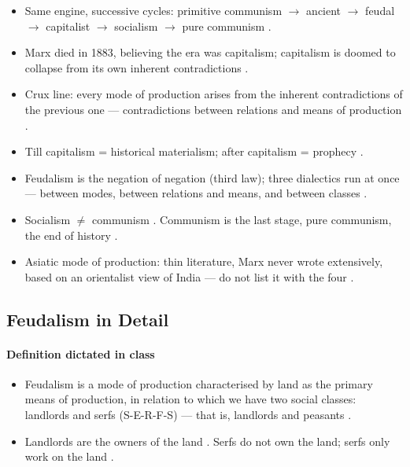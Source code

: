 \begin{QuickRevision}
\begin{itemize}
    \item Same engine, successive cycles: primitive communism $\rightarrow$ ancient $\rightarrow$ feudal $\rightarrow$ capitalist $\rightarrow$ socialism $\rightarrow$ pure communism .
    \item Marx died in 1883, believing the era was capitalism; capitalism is doomed to collapse from its own inherent contradictions .
    \item Crux line: every mode of production arises from the inherent contradictions of the previous one --- contradictions between relations and means of production .
    \item Till capitalism = historical materialism; after capitalism = prophecy .
    \item Feudalism is the negation of negation (third law); three dialectics run at once --- between modes, between relations and means, and between classes .
    \item Socialism $\neq$ communism . Communism is the last stage, pure communism, the end of history .
    \item Asiatic mode of production: thin literature, Marx never wrote extensively, based on an orientalist view of India --- do not list it with the four .
\end{itemize}
\end{QuickRevision}

\subsection{Feudalism in Detail}

\paragraph{Definition dictated in class}
\begin{itemize}
    \item Feudalism is a mode of production characterised by land as the primary means of production, in relation to which we have two social classes: landlords and serfs (S-E-R-F-S) --- that is, landlords and peasants .
    \item Landlords are the owners of the land . Serfs do not own the land; serfs only work on the land .
\end{itemize}

